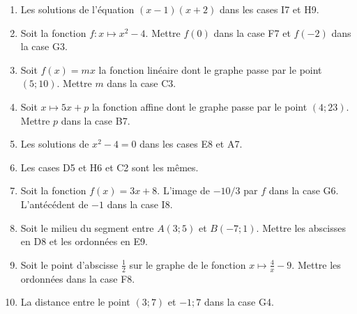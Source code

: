 


\begin{multicols}{2}

    \begin{minipage}{7cm}
        
    \end{minipage}

    \vspace{1cm}

    \begin{enumerate}
        \item
            Les solutions de l'équation \( (x-1)(x+2)\) dans les cases I7 et H9.
        \item
            Soit la fonction \( f\colon x\mapsto x^2-4\). Mettre \( f(0)\) dans la case F7 et \( f(-2)\) dans la case G3.
        \item
            Soit \( f(x)=mx\) la fonction linéaire dont le graphe passe par le point \( (5;10)\). Mettre \( m\) dans la case C3.
        \item
            Soit \( x\mapsto 5x+p\) la fonction affine dont le graphe passe par le point \( (4;23)\). Mettre \( p\) dans la case B7.
        \item
            Les solutions de \( x^2-4=0\) dans les cases E8 et A7.
        \item
            Les cases D5 et H6 et C2 sont les mêmes.
        \item
            Soit la fonction \( f(x)=3x+8\). L'image de \( -10/3\) par \( f\) dans la case G6. L'antécédent de \( -1\) dans la case I8.
        \item
            Soit le milieu du segment entre \( A(3;5)\) et \( B(-7;1)\). Mettre les abscisses en D8 et les ordonnées en E9.
        \item
            Soit le point d'abscisse \( \frac{ 1 }{2}\) sur le graphe de le fonction \( x\mapsto \frac{4}{ x }-9\). Mettre les ordonnées dans la case F8.
        \item
            La distance entre le point \( (3;7)\) et \( -1;7\) dans la case G4.        
    \end{enumerate}
\end{multicols}

